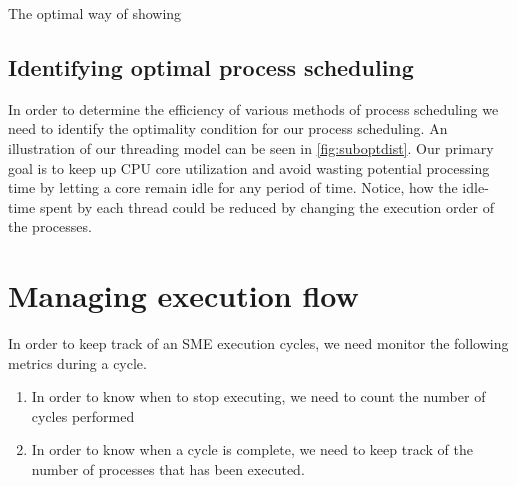 


The optimal way of showing 

\subsection{Identifying optimal process scheduling}
In order to determine the efficiency of various methods of process
scheduling we need to identify the optimality condition for our
process scheduling. An illustration of our threading model can be seen
in \cref{fig:suboptdist}. Our primary goal is to keep up CPU core
utilization and avoid wasting potential processing time by letting a
core remain idle for any period of time. Notice, how the idle-time
spent by each thread could be reduced by changing the execution
order of the processes.


\section{Managing execution flow}
In order to keep track of an SME execution cycles, we need monitor the
following metrics during a cycle.
\begin{enumerate}
\item In order to know when to stop executing, we need to count the
  number of cycles performed
\item In order to know when a cycle is complete, we need to keep track
  of the number of processes that has been executed.
\end{enumerate}


